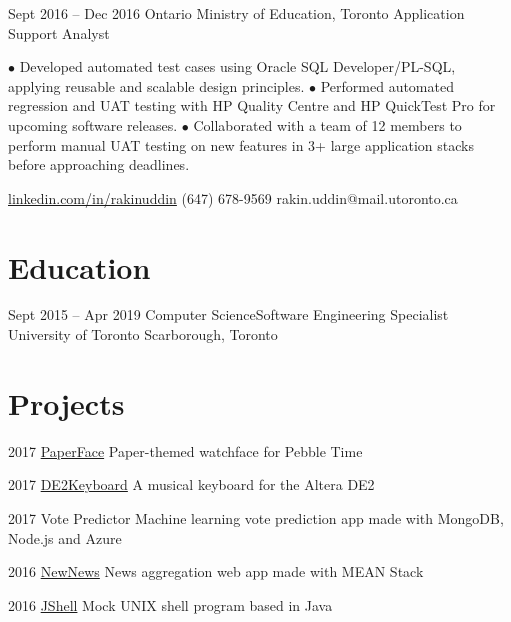 \documentclass[fontsize=10pt]{tccv}
\begin{document}
\begin{eventlist}
		\item{Sept 2016 -- Dec 2016}
		{Ontario Ministry of Education, Toronto}
		{Application Support Analyst}
		
		$\bullet$ Developed automated test cases using Oracle SQL Developer/PL-SQL, applying reusable and scalable design principles.\newline
		$\bullet$ Performed automated regression and UAT testing with HP Quality Centre and HP QuickTest Pro for upcoming software releases.\newline
		$\bullet$ Collaborated with a team of 12 members to perform manual UAT testing on new features in 3+ large application stacks before approaching deadlines.
		
	\end{eventlist}
	
	\personal
	{\href{linkedin.com/in/rakinuddin}{linkedin.com/in/rakinuddin}}
	{(647) 678-9569}
	{rakin.uddin@mail.utoronto.ca}
	
	\section{Education}
	
	\begin{yearlist}
		
		\item{Sept 2015 -- Apr 2019}
		{Computer Science\newline Software Engineering Specialist}
		{University of Toronto Scarborough, Toronto}
		
	\end{yearlist}
	
	\section{Projects}
	
	\begin{yearlist}
		
		\item{2017}
		{\href{https://github.com/ItsMeWithTheFace/PaperFace}{PaperFace}}
		{Paper-themed watchface for Pebble Time}
		
		\item{2017}
		{\href{https://github.com/ItsMeWithTheFace/DE2Keyboard}{DE2Keyboard}}
		{A musical keyboard for the Altera DE2}
		
		\item{2017}
		{Vote Predictor}
		{Machine learning vote prediction app made with MongoDB, Node.js and Azure}
		
		\item{2016}
		{\href{https://github.com/ItsMeWithTheFace/NewNews}{NewNews}}
		{News aggregation web app made with MEAN Stack}
		
		\item{2016}
		{\href{https://github.com/ItsMeWithTheFace/JShell}{JShell}}
		{Mock UNIX shell program based in Java}
		
	\end{yearlist}
	
\end{document}
